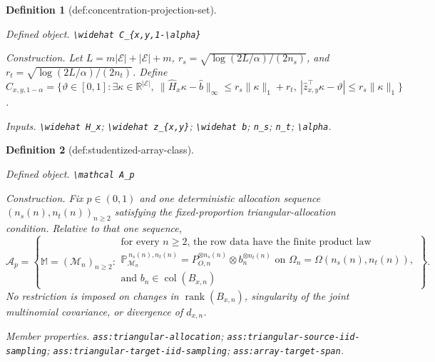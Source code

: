 \documentclass{article}
\newtheorem{definition}{Definition}
\begin{document}
\begin{definition}[def:concentration-projection-set]\label{def:concentration-projection-set}
\par\smallskip\noindent\emph{Defined object.} \texttt{\textbackslash{}\allowbreak{}widehat C\_\allowbreak{}\{x,\allowbreak{}y,\allowbreak{}1-\allowbreak{}\textbackslash{}\allowbreak{}alpha\}\allowbreak{}}
\par\smallskip\noindent\emph{Construction.} Let \(L=m\lvert\mathcal E\rvert+\lvert\mathcal E\rvert+m\), \(r_s=\sqrt{\log(2L/\alpha)/(2n_s)}\), and \(r_t=\sqrt{\log(2L/\alpha)/(2n_t)}\). Define \(\widehat C_{x,y,1-\alpha}=\{\vartheta\in[0,1]:\exists\kappa\in\mathbb R^{\lvert\mathcal E\rvert},\ \lVert\widehat H_x\kappa-\widehat b\rVert_{\infty}\le r_s\lVert\kappa\rVert_1+r_t,\ |\widehat z_{x,y}^{\top}\kappa-\vartheta|\le r_s\lVert\kappa\rVert_1\}\).
\par\smallskip\noindent\emph{Inputs.} \texttt{\textbackslash{}\allowbreak{}widehat H\_\allowbreak{}x}; \texttt{\textbackslash{}\allowbreak{}widehat z\_\allowbreak{}\{x,\allowbreak{}y\}\allowbreak{}}; \texttt{\textbackslash{}\allowbreak{}widehat b}; \texttt{n\_\allowbreak{}s}; \texttt{n\_\allowbreak{}t}; \texttt{\textbackslash{}\allowbreak{}alpha}.
\end{definition}

\begin{definition}[def:studentized-array-class]\label{def:studentized-array-class}
\par\smallskip\noindent\emph{Defined object.} \texttt{\textbackslash{}\allowbreak{}mathcal A\_\allowbreak{}p}
\par\smallskip\noindent\emph{Construction.} Fix \(p\in(0,1)\) and one deterministic allocation sequence \((n_s(n),n_t(n))_{n\ge2}\) satisfying the fixed-proportion triangular-allocation condition. Relative to that one sequence,
\[
\mathcal A_p=\left\{\mathbb M=(\mathcal M_n)_{n\ge2}:\begin{array}{l}
\text{for every \(n\ge2\), the row data have the finite product law }\\
\mathbb P_{\mathcal M_n}^{\,n_s(n),n_t(n)}=P_{O,n}^{\otimes n_s(n)}\otimes b_n^{\otimes n_t(n)}
\text{ on }\Omega_n=\Omega(n_s(n),n_t(n)),\\
\text{and }b_n\in\operatorname{col}(B_{x,n})
\end{array}\right\}.
\]
No restriction is imposed on changes in \(\operatorname{rank}(B_{x,n})\), singularity of the joint multinomial covariance, or divergence of \(d_{x,n}\).
\par\smallskip\noindent\emph{Member properties.} \texttt{ass:\allowbreak{}triangular-\allowbreak{}allocation}; \texttt{ass:\allowbreak{}triangular-\allowbreak{}source-\allowbreak{}iid-\allowbreak{}sampling}; \texttt{ass:\allowbreak{}triangular-\allowbreak{}target-\allowbreak{}iid-\allowbreak{}sampling}; \texttt{ass:\allowbreak{}array-\allowbreak{}target-\allowbreak{}span}.
\end{definition}
\end{document}
